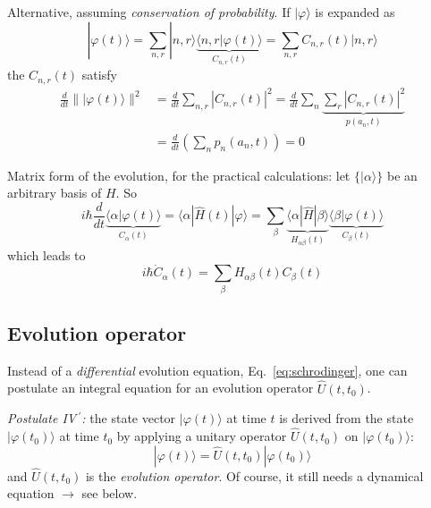 \documentclass[12pt]{article}
\begin{document}
Alternative, assuming \emph{conservation of probability}.
If $|\varphi\rangle$ is expanded as
\begin{equation}
|\varphi(t)\rangle=\sum_{n, r}|n, r\rangle
\underbrace{\langle n, r| \varphi(t)\rangle}_{C_{n, r}(t)}
=\sum_{n, r} C_{n, r}(t)|n, r\rangle
\end{equation}
the $C_{n, r}(t)$ satisfy
\begin{equation}
\begin{aligned} \frac{d}{d t}\| |\varphi(t)\rangle \|^{2} &=\frac{d}{d t} \sum_{n, r}\left|C_{n, r}(t)\right|^{2}=\frac{d}{d t} \sum_{n} 
\underbrace{\sum_r \left|C_{n, r}(t)\right|^{2}}_{p\left(a_{n}, t\right)} \\ 
&=\frac{d}{d t}\left(\sum_{n} p_{n}\left(a_{n}, t\right)\right)=0 
\end{aligned}
\end{equation}

Matrix form of the evolution, for the practical calculations: 
let $\{|\alpha\rangle\}$ be an arbitrary basis of $H$. So
\[
i\hbar \frac{d}{d t} \underbrace{\langle\alpha | \varphi(t)\rangle}_{C_{\alpha}(t)}=
\langle\alpha|\hat{H}(t)| \varphi\rangle=
\sum_\beta
\underbrace{\langle\alpha|\hat{H}|\beta\rangle}_{H_{\alpha \beta}(t)}
\underbrace{\langle\beta|\varphi(t)\rangle}_{C_\beta(t)}
\]
which leads to
\begin{equation}
\boxed{i \hbar \dot{C}_{\alpha}(t)=\sum_{\beta} H_{\alpha \beta}(t) C_{\beta}(t)}
\end{equation}


\subsection{Evolution operator}

Instead of a \emph{differential} evolution equation,
Eq.~\ref{eq:schrodinger}, one can postulate an integral equation
for an evolution operator $\hat{U}(t,t_0)$.

\emph{Postulate IV$\,^\prime$:} the state vector $|\varphi(t)\rangle$ at time $t$
is derived from the state $|\varphi(t_0)\rangle$ at
time $t_0$ by applying a unitary operator $\hat{U}(t, t_0)$ on $|\varphi(t_0)\rangle$:
\begin{equation}
\boxed{
|\varphi(t)\rangle = \hat{U}(t, t_0)|\varphi(t_0)\rangle
}
\label{eq:postulate4prime}
\end{equation} 
and $\hat{U}(t, t_0)$ is the \emph{evolution operator}. 
Of course, it still needs a dynamical equation $\to$ see below.
\end{document}
